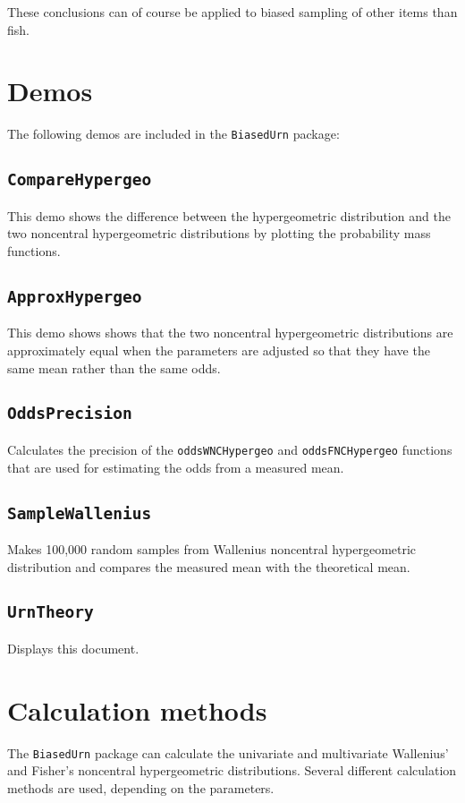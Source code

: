 \documentclass[a4paper]{article}
\begin{document}
These conclusions can of course be applied to biased sampling of
other items than fish.

\section{Demos}
%
The following demos are included in the {\tt BiasedUrn} package:

\subsection{\tt CompareHypergeo}
%
This demo shows the difference between the hypergeometric distribution
and the two noncentral hypergeometric distributions by plotting
the probability mass functions.

\subsection{\tt ApproxHypergeo}
%
This demo shows shows that the two noncentral hypergeometric 
distributions are approximately equal when the parameters are
adjusted so that they have the same mean rather than the same odds.

\subsection{\tt OddsPrecision}
%
Calculates the precision of the {\tt oddsWNCHypergeo} and {\tt oddsFNCHypergeo}
functions that are used for estimating the odds from a measured mean.

\subsection{\tt SampleWallenius}
%
Makes 100,000 random samples from Wallenius noncentral hypergeometric 
distribution and compares the measured mean with the theoretical mean.

\subsection{\tt UrnTheory}
%
Displays this document.


\section{Calculation methods}
%
The {\tt BiasedUrn} package can calculate the univariate 
and multivariate
Wallenius' and Fisher's noncentral hypergeometric distributions.
Several different calculation methods are used, depending on the 
parameters.
\end{document}
